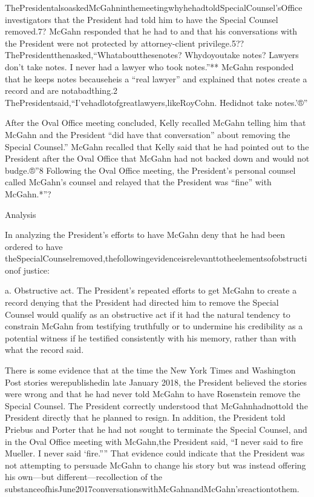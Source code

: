 ThePresidentalsoaskedMcGahninthemeetingwhyhehadtoldSpecialCounsel'sOffice investigators that the President had told him to have the Special Counsel removed.7? McGahn responded that he had to and that his conversations with the President were not protected by attorney-client privilege.5?? ThePresidentthenasked,“Whataboutthesenotes? Whydoyoutake notes? Lawyers don't take notes. I never had a lawyer who took notes.”** McGahn responded that he keeps notes becauseheis a “real lawyer” and explained that notes create a record and are notabadthing.2 ThePresidentsaid,“I'vehadlotofgreatlawyers,likeRoyCohn. Hedidnot take notes.'®”

After the Oval Office meeting concluded, Kelly recalled McGahn telling him that McGahn and the President “did have that conversation” about removing the Special Counsel.” McGahn recalled that Kelly said that he had pointed out to the President after the Oval Office that McGahn had not backed down and would not budge.®”8 Following the Oval Office meeting, the President's personal counsel called McGahn's counsel and relayed that the President was “fine” with McGahn.*”?

Analysis

In analyzing the President's efforts to have McGahn deny that he had been ordered to have theSpecialCounselremoved,thefollowingevidenceisrelevanttotheelementsofobstructionof
justice:

a. Obstructive act. The President's repeated efforts to get McGahn to create a record denying that the President had directed him to remove the Special Counsel would qualify as an obstructive act if it had the natural tendency to constrain McGahn from testifying truthfully or to undermine his credibility as a potential witness if he testified consistently with his memory, rather than with what the record said.

There is some evidence that at the time the New York Times and Washington Post stories werepublishedin late January 2018, the President believed the stories were wrong and that he had never told McGahn to have Rosenstein remove the Special Counsel. The President correctly understood that McGahnhadnottold the President directly that he planned to resign. In addition, the President told Priebus and Porter that he had not sought to terminate the Special Counsel, and
in the Oval Office meeting with McGahn,the President said, “I never said to fire Mueller. I never said ‘fire.”” That evidence could indicate that the President was not attempting to persuade McGahn to change his story but was instead offering his own—but different—recollection of the substanceofhisJune2017conversationswithMcGahnandMcGahn'sreactiontothem.

